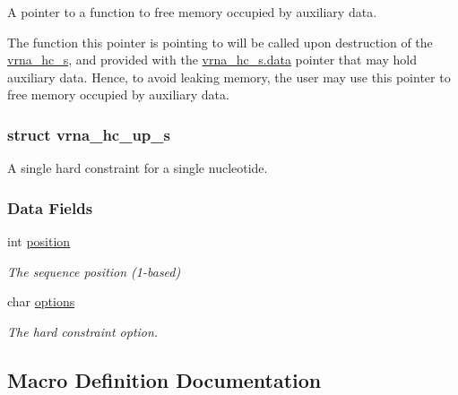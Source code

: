 A pointer to a function to free memory occupied by auxiliary data. 

The function this pointer is pointing to will be called upon destruction of the \hyperlink{group__hard__constraints_structvrna__hc__s}{vrna\+\_\+hc\+\_\+s}, and provided with the \hyperlink{group__hard__constraints_acef3d722142cb5f4a8e114e5fbce3b1a}{vrna\+\_\+hc\+\_\+s.\+data} pointer that may hold auxiliary data. Hence, to avoid leaking memory, the user may use this pointer to free memory occupied by auxiliary data. \label{structvrna__hc__up__s}
\hypertarget{group__hard__constraints_structvrna__hc__up__s}{}
\subsubsection{struct vrna\+\_\+hc\+\_\+up\+\_\+s}
A single hard constraint for a single nucleotide. \subsubsection*{Data Fields}
\begin{DoxyCompactItemize}
\item 
int \hyperlink{group__hard__constraints_a67a98def263c534a8c57298098da16e8}{position}\hypertarget{group__hard__constraints_a67a98def263c534a8c57298098da16e8}{}\label{group__hard__constraints_a67a98def263c534a8c57298098da16e8}

\begin{DoxyCompactList}\small\item\em The sequence position (1-\/based) \end{DoxyCompactList}\item 
char \hyperlink{group__hard__constraints_a8bdeffbacefaa77d2d1c8ff0a7f52157}{options}\hypertarget{group__hard__constraints_a8bdeffbacefaa77d2d1c8ff0a7f52157}{}\label{group__hard__constraints_a8bdeffbacefaa77d2d1c8ff0a7f52157}

\begin{DoxyCompactList}\small\item\em The hard constraint option. \end{DoxyCompactList}\end{DoxyCompactItemize}


\subsection{Macro Definition Documentation}
